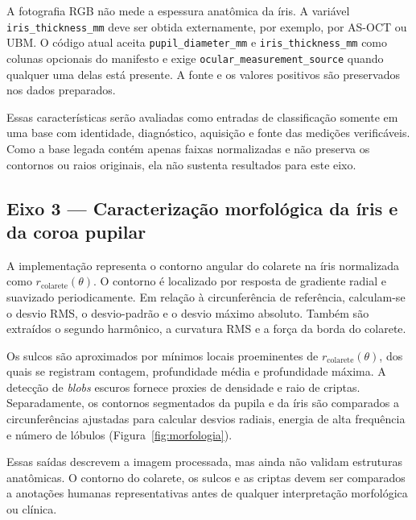\documentclass[12pt,a4paper]{article}
\begin{document}
A fotografia RGB não mede a espessura anatômica da íris. A variável
\texttt{iris\_thickness\_mm} deve ser obtida externamente, por exemplo, por AS-OCT ou UBM. O código
atual aceita \texttt{pupil\_diameter\_mm} e \texttt{iris\_thickness\_mm} como colunas opcionais do
manifesto e exige \texttt{ocular\_measurement\_source} quando qualquer uma delas está presente. A
fonte e os valores positivos são preservados nos dados preparados.

Essas características serão avaliadas como entradas de classificação somente em uma base com
identidade, diagnóstico, aquisição e fonte das medições verificáveis. Como a base legada contém apenas
faixas normalizadas e não preserva os contornos ou raios originais, ela não sustenta resultados para
este eixo.

\subsection{Eixo 3 --- Caracterização morfológica da íris e da coroa pupilar}
A implementação representa o contorno angular do colarete na íris normalizada como
$r_{\mathrm{colarete}}(\theta)$. O contorno é localizado por resposta de gradiente radial e suavizado
periodicamente. Em relação à circunferência de referência, calculam-se o desvio RMS, o desvio-padrão e
o desvio máximo absoluto. Também são extraídos o segundo harmônico, a curvatura RMS e a força da borda
do colarete.

Os sulcos são aproximados por mínimos locais proeminentes de $r_{\mathrm{colarete}}(\theta)$, dos
quais se registram contagem, profundidade média e profundidade máxima. A detecção de \emph{blobs}
escuros fornece proxies de densidade e raio de criptas. Separadamente, os contornos segmentados da
pupila e da íris são comparados a circunferências ajustadas para calcular desvios radiais, energia de
alta frequência e número de lóbulos (Figura~\ref{fig:morfologia}).

Essas saídas descrevem a imagem processada, mas ainda não validam estruturas anatômicas. O contorno do
colarete, os sulcos e as criptas devem ser comparados a anotações humanas representativas antes de
qualquer interpretação morfológica ou clínica.
\end{document}
